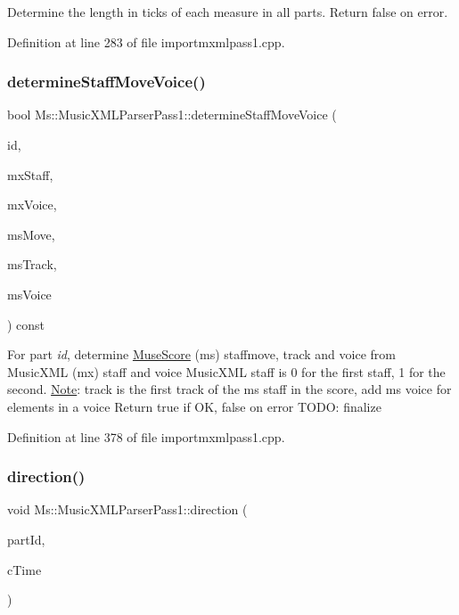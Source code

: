 Determine the length in ticks of each measure in all parts. Return false on error. 

Definition at line 283 of file importmxmlpass1.\+cpp.

\mbox{\label{class_ms_1_1_music_x_m_l_parser_pass1_a818455585a8cfd20fea4c6a2131a33b0}} 
\subsubsection{\texorpdfstring{determine\+Staff\+Move\+Voice()}{determineStaffMoveVoice()}}
{\footnotesize\ttfamily bool Ms\+::\+Music\+X\+M\+L\+Parser\+Pass1\+::determine\+Staff\+Move\+Voice (\begin{DoxyParamCaption}\item[{const Q\+String \&}]{id,  }\item[{const int}]{mx\+Staff,  }\item[{const Q\+String \&}]{mx\+Voice,  }\item[{int \&}]{ms\+Move,  }\item[{int \&}]{ms\+Track,  }\item[{int \&}]{ms\+Voice }\end{DoxyParamCaption}) const}

For part {\itshape id}, determine \hyperlink{class_ms_1_1_muse_score}{Muse\+Score} (ms) staffmove, track and voice from Music\+X\+ML (mx) staff and voice Music\+X\+ML staff is 0 for the first staff, 1 for the second. \hyperlink{class_ms_1_1_note}{Note}\+: track is the first track of the ms staff in the score, add ms voice for elements in a voice Return true if OK, false on error T\+O\+DO\+: finalize 

Definition at line 378 of file importmxmlpass1.\+cpp.

\mbox{\label{class_ms_1_1_music_x_m_l_parser_pass1_a5a81de5bea8927e52140306a2fba53b0}} 
\subsubsection{\texorpdfstring{direction()}{direction()}}
{\footnotesize\ttfamily void Ms\+::\+Music\+X\+M\+L\+Parser\+Pass1\+::direction (\begin{DoxyParamCaption}\item[{const Q\+String \&}]{part\+Id,  }\item[{const \hyperlink{class_ms_1_1_fraction}{Fraction}}]{c\+Time }\end{DoxyParamCaption})}

